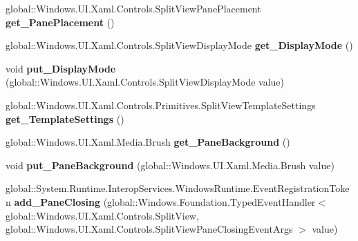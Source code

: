 \begin{DoxyCompactItemize}
global\+::\+Windows.\+U\+I.\+Xaml.\+Controls.\+Split\+View\+Pane\+Placement {\bfseries get\+\_\+\+Pane\+Placement} ()
\item 
\mbox{\label{interface_windows_1_1_u_i_1_1_xaml_1_1_controls_1_1_i_split_view_a5c6b5fd189586ae6a4809f2028b036e9}} 
global\+::\+Windows.\+U\+I.\+Xaml.\+Controls.\+Split\+View\+Display\+Mode {\bfseries get\+\_\+\+Display\+Mode} ()
\item 
\mbox{\label{interface_windows_1_1_u_i_1_1_xaml_1_1_controls_1_1_i_split_view_a31d4c4574b734f77622f95bc78b04c1a}} 
void {\bfseries put\+\_\+\+Display\+Mode} (global\+::\+Windows.\+U\+I.\+Xaml.\+Controls.\+Split\+View\+Display\+Mode value)
\item 
\mbox{\label{interface_windows_1_1_u_i_1_1_xaml_1_1_controls_1_1_i_split_view_a5d410ee30d731de0a395a350b650dabb}} 
global\+::\+Windows.\+U\+I.\+Xaml.\+Controls.\+Primitives.\+Split\+View\+Template\+Settings {\bfseries get\+\_\+\+Template\+Settings} ()
\item 
\mbox{\label{interface_windows_1_1_u_i_1_1_xaml_1_1_controls_1_1_i_split_view_a1c78e9b7f929fa0f024bfd75bd93b2b3}} 
global\+::\+Windows.\+U\+I.\+Xaml.\+Media.\+Brush {\bfseries get\+\_\+\+Pane\+Background} ()
\item 
\mbox{\label{interface_windows_1_1_u_i_1_1_xaml_1_1_controls_1_1_i_split_view_a097467d9287cc5b1864024d0d471fe18}} 
void {\bfseries put\+\_\+\+Pane\+Background} (global\+::\+Windows.\+U\+I.\+Xaml.\+Media.\+Brush value)
\item 
\mbox{\label{interface_windows_1_1_u_i_1_1_xaml_1_1_controls_1_1_i_split_view_a69ee46b94201df4d3b787eb9e974289a}} 
global\+::\+System.\+Runtime.\+Interop\+Services.\+Windows\+Runtime.\+Event\+Registration\+Token {\bfseries add\+\_\+\+Pane\+Closing} (global\+::\+Windows.\+Foundation.\+Typed\+Event\+Handler$<$ global\+::\+Windows.\+U\+I.\+Xaml.\+Controls.\+Split\+View, global\+::\+Windows.\+U\+I.\+Xaml.\+Controls.\+Split\+View\+Pane\+Closing\+Event\+Args $>$ value)

\end{DoxyCompactItemize}
